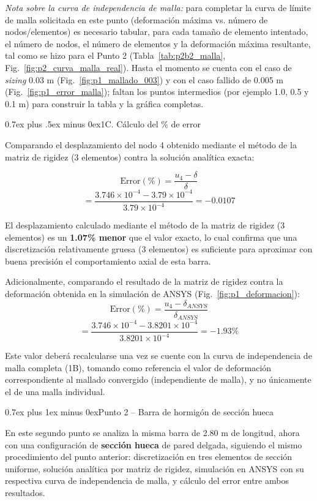 \documentclass[conference]{IEEEtran}
\makeatletter
\def\section{\@startsection{section}{1}{\z@}{1.5ex plus 1.5ex minus 0.5ex}%
{0.7ex plus 1ex minus 0ex}{\normalfont\large\bfseries\centering\scshape}}%
\def\subsection{\@startsection{subsection}{2}{\z@}{1.5ex plus 1.5ex minus 0.5ex}%
{0.7ex plus .5ex minus 0ex}{\normalfont\normalsize\bfseries}}%
\makeatother
\begin{document}
\textit{Nota sobre la curva de independencia de malla:} para completar la curva de límite de malla solicitada en este punto (deformación máxima vs. número de nodos/elementos) es necesario tabular, para cada tamaño de elemento intentado, el número de nodos, el número de elementos y la deformación máxima resultante, tal como se hizo para el Punto 2 (Tabla~\ref{tab:p2b2_malla}, Fig.~\ref{fig:p2_curva_malla_real}). Hasta el momento se cuenta con el caso de \textit{sizing} 0.03 m (Fig.~\ref{fig:p1_mallado_003}) y con el caso fallido de 0.005 m (Fig.~\ref{fig:p1_error_malla}); faltan los puntos intermedios (por ejemplo 1.0, 0.5 y 0.1 m) para construir la tabla y la gráfica completas.

\subsection{1C. Cálculo del \% de error}

Comparando el desplazamiento del nodo 4 obtenido mediante el método de la matriz de rigidez (3 elementos) contra la solución analítica exacta:

\[
\text{Error}(\%)=\frac{u_4-\delta}{\delta}
\]
\[
=\frac{3.746\times10^{-4}-3.79\times10^{-4}}{3.79\times10^{-4}}=-0.0107
\]

El desplazamiento calculado mediante el método de la matriz de rigidez (3 elementos) es un \textbf{1.07\% menor} que el valor exacto, lo cual confirma que una discretización relativamente gruesa (3 elementos) es suficiente para aproximar con buena precisión el comportamiento axial de esta barra.

Adicionalmente, comparando el resultado de la matriz de rigidez contra la deformación obtenida en la simulación de ANSYS (Fig.~\ref{fig:p1_deformacion}):
\[
\text{Error}(\%)=\frac{u_4-\delta_{ANSYS}}{\delta_{ANSYS}}
\]
\[
=\frac{3.746\times10^{-4}-3.8201\times10^{-4}}{3.8201\times10^{-4}}=-1.93\%
\]

Este valor deberá recalcularse una vez se cuente con la curva de independencia de malla completa (1B), tomando como referencia el valor de deformación correspondiente al mallado convergido (independiente de malla), y no únicamente el de una malla individual.

\section{Punto 2 -- Barra de hormigón de sección hueca}

En este segundo punto se analiza la misma barra de 2.80 m de longitud, ahora con una configuración de \textbf{sección hueca} de pared delgada, siguiendo el mismo procedimiento del punto anterior: discretización en tres elementos de sección uniforme, solución analítica por matriz de rigidez, simulación en ANSYS con su respectiva curva de independencia de malla, y cálculo del error entre ambos resultados.
\end{document}
